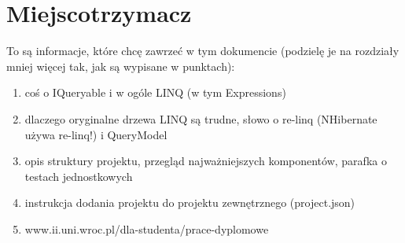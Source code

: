 \chapter{Miejscotrzymacz}
To są informacje, które chcę zawrzeć w tym dokumencie (podzielę je na rozdziały mniej więcej tak, jak są wypisane w punktach):
\begin{enumerate}
\item coś o IQueryable i w ogóle LINQ (w tym Expressions)
\item dlaczego oryginalne drzewa LINQ są trudne, słowo o re-linq (NHibernate używa re-linq!) i QueryModel
\item opis struktury projektu, przegląd najważniejszych komponentów, parafka o testach jednostkowych
\item instrukcja dodania projektu do projektu zewnętrznego (project.json)
\item www.ii.uni.wroc.pl/dla-studenta/prace-dyplomowe
\end{enumerate}
